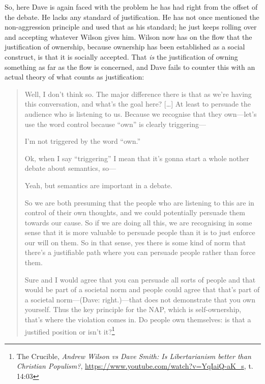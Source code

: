 \documentclass[11pt]{article}
\begin{document}
So, here Dave is again faced with the problem he has had right from the offset of the debate. He lacks any standard of justification. He has not once mentioned the non-aggression principle and used that as his standard; he just keeps rolling over and accepting whatever Wilson gives him. Wilson now has on the flow that the justification of ownership, because ownership has been established as a social construct, is that it is socially accepted. That \emph{is} the justification of owning something as far as the flow is concerned, and Dave fails to counter this with an actual theory of what counts as justification:
\begin{quote}
Well, I don't think so. The major difference there is that as we're having this conversation, and what's the goal here? [\ldots{}] At least to persuade the audience who is listening to us. Because we recognise that they own---let's use the word control because ``own'' is clearly triggering---

I'm not triggered by the word ``own.''

Ok, when I say ``triggering'' I mean that it's gonna start a whole nother debate about semantics, so---

Yeah, but semantics are important in a debate.

So we are both presuming that the people who are listening to this are in control of their own thoughts, and we could potentially persuade them towards our cause. So if we are doing all this, we are recognising in some sense that it is more valuable to persuade people than it is to just enforce our will on them. So in that sense, yes there is some kind of norm that there's a justifiable path where you can persuade people rather than force them.

Sure and I would agree that you can persuade all sorts of people and that would be part of a societal norm and people could agree that that's part of a societal norm---(Dave: right.)---that does not demonstrate that you own yourself. Thus the key principle for the NAP, which is self-ownership, that's where the violation comes in. Do people own themselves: is that a justified position or isn't it?\footnote{The Crucible, \emph{Andrew Wilson vs Dave Smith: Is Libertarianism better than Christian Populism?}, \url{https://www.youtube.com/watch?v=YqIaiQ-aK\_s}, t. 14:03}
\end{quote}
\end{document}
